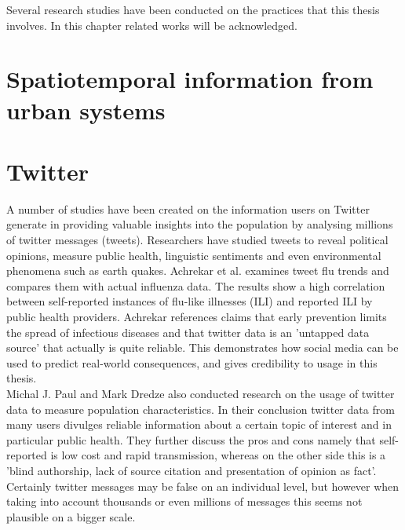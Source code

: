 Several research studies have been conducted on the practices that this thesis involves. In this chapter related works will be acknowledged.

\section{Spatiotemporal information from urban systems}


\section{Twitter}
A number of studies have been created on the information users on Twitter generate in providing valuable insights into the population by analysing millions of twitter messages (tweets). Researchers have studied tweets to reveal political opinions\cite{twitter_politic}, measure public health\cite{twitter_flu_trends}, linguistic sentiments\cite{twitter_linguistics} and even environmental phenomena such as earth quakes\cite{twitter_earthQuake}. Achrekar et al.\cite{twitter_flu_trends} examines tweet flu trends and compares them with actual influenza data. The results show a high correlation between self-reported instances of flu-like illnesses (ILI) and reported ILI by public health providers. Achrekar references claims that early prevention limits the spread of infectious diseases and that twitter data is an 'untapped data source' that actually is quite reliable. This demonstrates how social media can be  used to predict real-world consequences, and gives credibility to usage in this thesis. \\Michal J. Paul and Mark Dredze \cite{twitter_what_you_tweet} also conducted research on the usage of twitter data to measure population characteristics. In their conclusion twitter data from many users divulges reliable information about a certain topic of interest and in particular public health. They further discuss the pros and cons namely that self-reported is low cost and rapid transmission, whereas on the other side this is a 'blind authorship, lack of source citation and presentation of opinion as fact'. Certainly twitter messages may be false on an individual level, but however when taking into account thousands or even millions of messages this seems not plausible on a bigger scale.